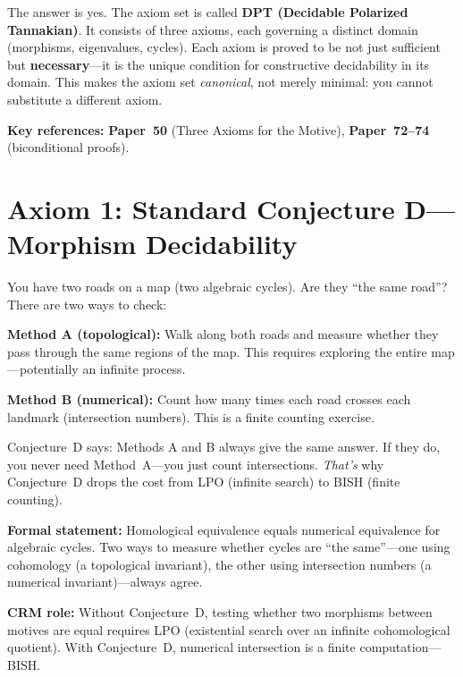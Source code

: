 \documentclass[11pt,twoside,openany]{report}
\theoremstyle{remark}
\newcommand{\BISH}{\textsf{BISH}}
\newcommand{\LPO}{\textsf{LPO}}
\newcommand{\paperref}[1]{\textbf{Paper~#1}}
\begin{document}
The answer is yes. The axiom set is called \textbf{DPT (Decidable Polarized Tannakian)}. It consists of three axioms, each governing a distinct domain (morphisms, eigenvalues, cycles). Each axiom is proved to be not just sufficient but \textbf{necessary}---it is the unique condition for constructive decidability in its domain. This makes the axiom set \emph{canonical}, not merely minimal: you cannot substitute a different axiom.

\begin{keyrefbox}
\textbf{Key references:} \paperref{50} (Three Axioms for the Motive), \paperref{72--74} (biconditional proofs).
\end{keyrefbox}


\section{Axiom 1: Standard Conjecture D---Morphism Decidability}

\begin{analogybox}
You have two roads on a map (two algebraic cycles). Are they ``the same road''? There are two ways to check:

\textbf{Method A (topological):} Walk along both roads and measure whether they pass through the same regions of the map. This requires exploring the entire map---potentially an infinite process.

\textbf{Method B (numerical):} Count how many times each road crosses each landmark (intersection numbers). This is a finite counting exercise.

Conjecture~D says: Methods A and B always give the same answer. If they do, you never need Method~A---you just count intersections. \emph{That's} why Conjecture~D drops the cost from \LPO{} (infinite search) to \BISH{} (finite counting).
\end{analogybox}

\textbf{Formal statement:} Homological equivalence equals numerical equivalence for algebraic cycles. Two ways to measure whether cycles are ``the same''---one using cohomology (a topological invariant), the other using intersection numbers (a numerical invariant)---always agree.

\textbf{CRM role:} Without Conjecture~D, testing whether two morphisms between motives are equal requires \LPO{} (existential search over an infinite cohomological quotient). With Conjecture~D, numerical intersection is a finite computation---\BISH.
\end{document}
